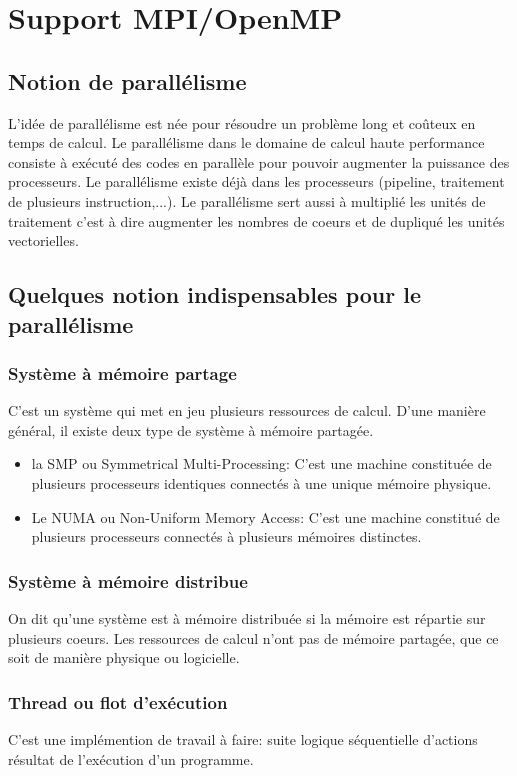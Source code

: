 \documentclass[a4paper,11pt]{report}
\begin{document}
\newpage
\chapter*{Support  MPI/OpenMP}
\section{Notion de parallélisme}
\qquad L'idée de parallélisme est née pour résoudre un problème long et coûteux en temps de calcul. Le parallélisme dans le domaine de calcul haute performance consiste à exécuté des codes en parallèle pour pouvoir augmenter la puissance des processeurs. Le parallélisme existe déjà dans les processeurs (pipeline, traitement de plusieurs instruction,...). Le parallélisme sert aussi à multiplié les  unités de traitement c'est à dire augmenter les nombres de coeurs et de dupliqué les unités vectorielles.

\section{Quelques notion indispensables pour le parallélisme}
\subsection{Système à mémoire partage}
\qquad C'est un système qui met en jeu plusieurs ressources de calcul. D'une manière général, il existe deux type de système à mémoire partagée.
\begin{itemize}
    \item la SMP ou Symmetrical Multi-Processing:
    C'est une machine constituée de plusieurs processeurs identiques connectés à une unique mémoire physique.
    \item Le NUMA ou Non-Uniform Memory Access: 
    C'est une machine constitué de plusieurs processeurs connectés à plusieurs mémoires distinctes.
\end{itemize}
\subsection{Système à mémoire distribue}
\qquad On dit qu'une système est à mémoire distribuée si la mémoire est répartie sur plusieurs coeurs. Les ressources de calcul n'ont pas de mémoire partagée, que ce soit de manière physique ou logicielle.
\subsection{Thread ou flot d'exécution}
\qquad C'est une implémention de travail à faire: suite logique séquentielle d'actions résultat de
l'exécution d'un programme.
\end{document}
